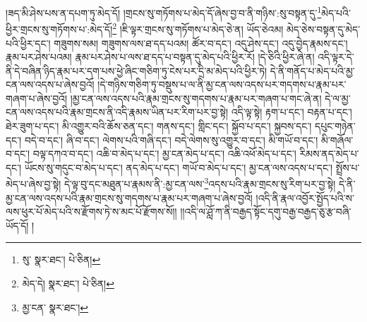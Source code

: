 །ཟད་མི་ཤེས་པས་ན་དཔག་ཏུ་མེད་དོ། །གྲངས་སུ་གཏོགས་པ་མེད་དོ་ཞེས་བྱ་བ་ནི་གཉིས་:སུ་བསྟན་དུ་\footnote{སུ་  སྣར་ཐང་།  པེ་ཅིན། }མེད་པའི་ཕྱིར་གྲངས་སུ་གཏོགས་པ་:མེད་དོ།\footnote{མེད་དེ།  སྣར་ཐང་།  པེ་ཅིན། } །ཇི་ལྟར་གྲངས་སུ་གཏོགས་པ་མེད་ཅེ་ན། ཡོད་ཅེའམ། མེད་ཅེས་བསྟན་དུ་མེད་པའི་ཕྱིར་དང་། གཟུགས་སམ། གཟུགས་ལས་ཐ་དད་པའམ། ཚོར་བ་དང་། འདུ་ཤེས་དང་། འདུ་བྱེད་རྣམས་དང་། རྣམ་པར་ཤེས་པའམ། རྣམ་པར་ཤེས་པ་ལས་ཐ་དད་པ་བསྟན་དུ་མེད་པའི་ཕྱིར་རོ། །དེ་ཅིའི་ཕྱིར་ཞེ་ན། འདི་ལྟར་དེ་ནི་དེ་བཞིན་ཉིད་རྣམ་པར་དག་པས་ཕྱེ་ཞིང་གཅིག་ཏུ་ངེས་པར་དྲི་མ་མེད་པའི་ཕྱིར་ཏེ། དེ་ནི་གནོད་པ་མེད་པའི་མྱ་ངན་ལས་འདས་པ་ཞེས་བྱའོ། །དེ་གཉིས་གཅིག་ཏུ་བསྡུས་པ་ལ་ནི་མྱ་ངན་ལས་འདས་པར་གདགས་པ་རྣམ་པར་གཞག་པ་ཞེས་བྱའོ། །མྱ་ངན་ལས་འདས་པའི་རྣམ་གྲངས་སུ་གདགས་པ་རྣམ་པར་གཞག་པ་གང་ཞེ་ན། དེ་ལ་མྱ་ངན་ལས་འདས་པའི་རྣམ་གྲངས་ནི་འདི་རྣམས་ཡིན་པར་རིག་པར་བྱ་སྟེ། འདི་ལྟ་སྟེ། རྟག་པ་དང་། བརྟན་པ་དང་། ཐེར་ཟུག་པ་དང་། མི་འགྱུར་བའི་ཆོས་ཅན་དང་། གནས་དང་། གླིང་དང་། སྐྱོབ་པ་དང་། སྐྱབས་དང་། དཔུང་གཉེན་དང་། བདེ་བ་དང་། ཞི་བ་དང་། ལེགས་པའི་གཞི་དང་། བདེ་ལེགས་སུ་འགྱུར་བ་དང་། མི་གཡོ་བ་དང་། མི་གཞོལ་བ་དང་། བལྟ་དཀའ་བ་དང་། འཆི་བ་མེད་པ་དང་། མྱ་ངན་མེད་པ་དང་། འཆི་འཕོ་མེད་པ་དང་། རིམས་ནད་མེད་པ་དང་། ཡོངས་སུ་གདུང་བ་མེད་པ་དང་། ནད་མེད་པ་དང་། གཡོ་བ་མེད་པ་དང་། མྱ་ངན་ལས་འདས་པ་དང་། སྤྲོས་པ་མེད་པ་ཞེས་བྱ་སྟེ། དེ་ལྟ་བུ་དང་མཐུན་པ་རྣམས་ནི་:མྱ་ངན་ལས་\footnote{མྱ་ངན་  སྣར་ཐང་། }འདས་པའི་རྣམ་གྲངས་སུ་རིག་པར་བྱ་སྟེ། དེ་ནི་མྱ་ངན་ལས་འདས་པའི་རྣམ་གྲངས་སུ་གདགས་པ་རྣམ་པར་གཞག་པ་ཞེས་བྱའོ། །འདི་ནི་རྣལ་འབྱོར་སྤྱོད་པའི་ས་ལས་ཕུར་པོ་མེད་པའི་ས་རྫོགས་ཏེ་ས་མང་པོ་རྫོགས་སོ།། །།འདི་ལ་ཤློ་ཀ་ནི་བརྒྱད་སྟོང་དགུ་བརྒྱ་བརྒྱད་ཅུ་རྩ་བཞི་ཡོད་དོ། །
 